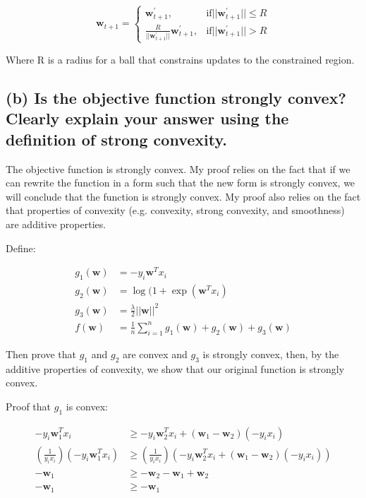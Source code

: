 \documentclass{article}
\begin{document}
\[
\mathbf{w}_{t + 1} =
\begin{cases}
\mathbf{w}_{t + 1}^{'},                                                         & \text{if} ||\mathbf{w}_{t + 1}^{'} || \leq R \\
\frac{R}{ || \mathbf{w}_{t + 1}^{'} ||} \mathbf{w}_{t + 1}^{'}, & \text{if} || \mathbf{w}_{t + 1}^{'} || > R
\end{cases}
\]

Where R is a radius for a ball that constrains updates to the constrained region.

\subsection{(b) Is the objective function strongly convex? Clearly explain your answer using the definition of strong convexity.}

The objective function is strongly convex.  My proof relies on the fact that if we can rewrite the function in a form such that the new form is strongly convex, we will conclude that the function is strongly convex.  My proof also relies on the fact that properties of convexity (e.g. convexity, strong convexity, and smoothness) are additive properties.

Define:

\begin{equation}
\begin{aligned}
g_1(\mathbf{w}) &= -y_i \mathbf{w}^T x_i \\
g_2(\mathbf{w}) &= \log(1 + \exp(\mathbf{w}^Tx_i) \\
g_3(\mathbf{w}) &= \frac\lambda2 || \mathbf{w} ||^2 \\
f(\mathbf{w}) &= \frac1n \sum\limits_{i=1}^n g_1(\mathbf{w}) + g_2(\mathbf{w}) + g_3(\mathbf{w})
\end{aligned}
\end{equation}

Then prove that $g_1$ and $g_2$ are convex and $g_3$ is strongly convex, then, by the additive properties of convexity, we show that our original function is strongly convex.

Proof that $g_1$ is convex:

\begin{equation}
\begin{aligned}
-y_i\mathbf{w}_1^Tx_i &\geq -y_i \mathbf{w}_2^T x_i + (\mathbf{w}_1 - \mathbf{w}_2) (-y_i x_i) \\
(\frac{ 1 }{ y_i x_i }) ( -y_i\mathbf{w}_1^Tx_i ) &\geq (\frac{ 1 }{ y_i x_i }) (-y_i \mathbf{w}_2^T x_i + (\mathbf{w}_1 - \mathbf{w}_2) (-y_i x_i) ) \\
- \mathbf{w}_1 &\geq - \mathbf{w}_2 - \mathbf{w}_1 + \mathbf{w}_2 \\
- \mathbf{w}_1 &\geq - \mathbf{w}_1
\end{aligned}
\end{equation}
\end{document}
